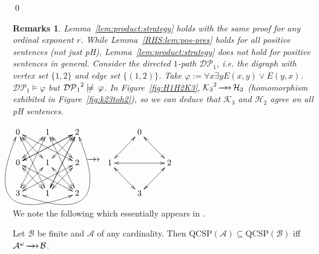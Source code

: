 \documentclass{LMCS}
\newtheorem*{remarks}{Remarks}
\newcommand{\notmodels}{\ensuremath{ \models \hspace{-3mm} / \hspace{2mm} }}
\newcommand{\surhom}{
  \ensuremath{
      \negthinspace 
      \longrightarrow
      \hspace{-5mm} \rightarrow \hspace{1mm}
  }
}
\begin{document}
\qed
\begin{remarks}
Lemma~\ref{lem:product:strategy} holds with the same proof for any ordinal exponent $r$.
While Lemma~\ref{RHS:lem:pos-pres} holds for all positive sentences (not just pH), Lemma~\ref{lem:product:strategy} does not hold for positive sentences in general. Consider the directed $1$-path $\mathcal{DP}_1$, \mbox{i.e.} the digraph with vertex set $\{1,2\}$ and edge set $\{(1,2)\}$. Take $\varphi:=\forall x\exists y E(x,y) \vee E(y,x)$. $\mathcal{DP}_1 \models \varphi$ but ${\mathcal{DP}_1}^2 \notmodels \varphi$. In Figure~\ref{fig:H1H2K3}, ${\mathcal{K}_3}^2 \surhom \mathcal{H}_2$ (homomorphism exhibited in Figure~\ref{fig:k23toh2}), so we can deduce that $\mathcal{K}_3$ and $\mathcal{H}_2$ agree on all pH sentences.
\end{remarks}


\begin{figure*}
  \centering
$
\xymatrix{
0  \ar@{<->}[dr]  \ar@{<->}[ddr]  \ar@{<->}[drr] \ar@/_5pc/@{<->}[ddrr] &
1 \ar@{<->}[dr] \ar@{<->}[dl] \ar@{<->}[ddr] \ar@{<->}[ddl] & 
2 \ar@{<->}[dl] \ar@{<->}[dll] \ar@{<->}[ddl] \ar@{<->}[ddl] \\
0 \ar@{<->}[urr] \ar@{<->}[drr] \ar@{<->}[dr] &
1 \ar@{<->}[dr] \ar@{<->}[dl] & 
2 \ar@{<->}[dl] \\
3 \ar@{<->}[urr]  \ar@/_5pc/@{<->}[uurr] &
1 & 
2  \\
}
$ \hspace{1cm} $\xymatrix{\\ \surhom\\ \\}$ \hspace{1cm}
$
\xymatrix{
& 0  \ar@{<->}[dr]  \ar@{<->}[dl] & \\
1  \ar@{<->}[rr] & & 2 \\
& 3  \ar@{<->}[ur]  \ar@{<->}[ul] & \\
}
$
  \caption{Surjective homomorphism from ${\mathcal{K}_3}^2$ to $\mathcal{H}_2$.}
  \label{fig:k23toh2}
\end{figure*}
\noindent We note the following which essentially appears in \cite{Keisler65}.
\begin{thm}
Let $\mathcal{B}$ be finite and $\mathcal{A}$ of any cardinality. Then $\mathrm{QCSP}(\mathcal{A})  \subseteq \mathrm{QCSP}(\mathcal{B})$ iff $\mathcal{A}^\omega \surhom \mathcal{B}$.
\end{thm}
\end{document}
